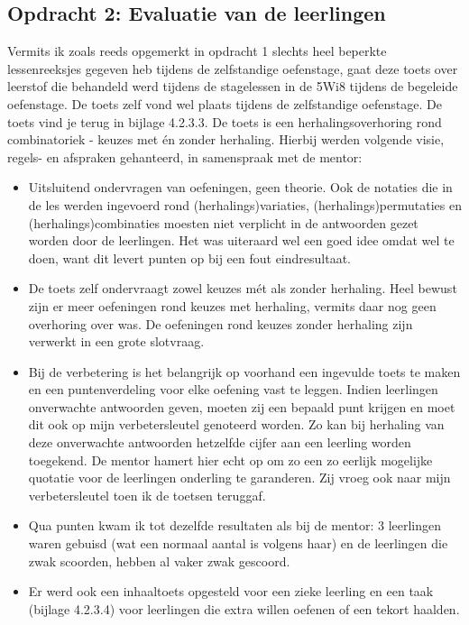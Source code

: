 \documentclass[a4paper,11pt]{article}
\theoremstyle{definition}
\begin{document}
\subsection{Opdracht 2: Evaluatie van de leerlingen}
Vermits ik zoals reeds opgemerkt in opdracht 1 slechts heel beperkte lessenreeksjes gegeven heb tijdens de 
zelfstandige oefenstage, gaat deze toets over leerstof die behandeld werd 
tijdens de stagelessen in de 5Wi8 tijdens de begeleide oefenstage. De toets zelf 
vond wel plaats tijdens de zelfstandige oefenstage. De toets vind je terug in 
bijlage 4.2.3.3. De toets is een herhalingsoverhoring rond combinatoriek - keuzes met én zonder herhaling.
Hierbij werden volgende visie, regels- en afspraken gehanteerd,
in samenspraak met de mentor:
\begin{itemize}
  \item Uitsluitend ondervragen van oefeningen, geen theorie. Ook de notaties 
  die in de les werden ingevoerd rond (herhalings)variaties, 
  (herhalings)permutaties en (herhalings)combinaties moesten niet verplicht in 
  de antwoorden gezet worden door de leerlingen. Het was uiteraard wel een goed 
  idee omdat wel te doen, want dit levert punten op bij een fout eindresultaat.
  \item De toets zelf ondervraagt zowel keuzes mét als zonder herhaling. 
  Heel bewust zijn er meer oefeningen rond keuzes met herhaling, vermits daar 
  nog geen overhoring over was. De oefeningen rond keuzes zonder herhaling zijn 
  verwerkt in een grote slotvraag.
  \item Bij de verbetering is het belangrijk op voorhand een ingevulde toets te 
 maken en een puntenverdeling voor elke oefening vast te leggen. Indien leerlingen onverwachte antwoorden
geven, moeten zij een bepaald punt krijgen en moet dit ook op mijn verbetersleutel genoteerd worden. 
Zo kan bij herhaling van deze onverwachte antwoorden hetzelfde cijfer aan een leerling worden toegekend.
De mentor hamert hier echt op om zo een zo eerlijk mogelijke quotatie voor de 
leerlingen onderling te garanderen. Zij vroeg ook naar mijn verbetersleutel toen ik 
de toetsen teruggaf.
\item Qua punten kwam ik tot dezelfde resultaten als bij de mentor: 3 leerlingen 
waren gebuisd (wat een normaal aantal is volgens haar) en de leerlingen die zwak 
scoorden, hebben al vaker zwak gescoord.
\item Er werd ook een inhaaltoets opgesteld voor een zieke leerling en een taak (bijlage 4.2.3.4) 
voor leerlingen die extra willen oefenen of een tekort haalden.
\end{itemize}
\end{document}
